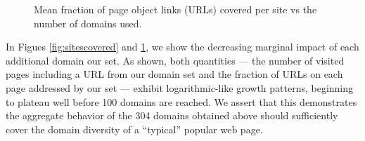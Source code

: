 \begin{figure}
    \caption{Mean fraction of page object links (URLs) covered per site vs the
    number of domains used.
    }
    \label{fig:linkscovered}
\end{figure}

In Figues \ref{fig:sitescovered} and \ref{fig:linkscovered}, we show the
decreasing marginal impact of each additional domain our set. As shown, both
quantities --- the number of visited pages including a URL from our domain set and the
fraction of URLs on each page addressed by our set --- exhibit logarithmic-like
growth patterns, beginning to plateau well before 100 domains are reached. We
assert that this demonstrates the aggregate behavior of the 304 domains obtained above
should sufficiently cover the domain diversity of a ``typical'' popular web page. 


